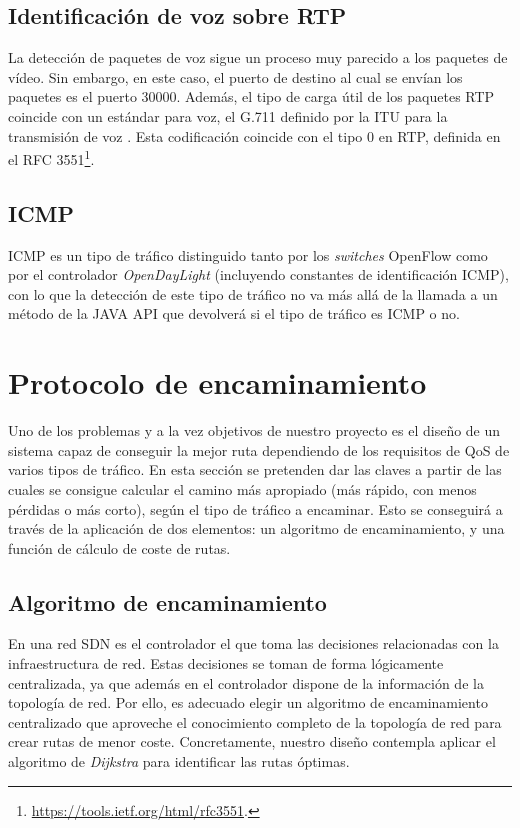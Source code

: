 \documentclass[a4paper,11pt]{book}
\begin{document}
%
\subsection{Identificación de voz sobre \ac{RTP}}
La detección de paquetes de voz sigue un proceso muy parecido a los paquetes de vídeo. Sin embargo, en este caso, el puerto de destino al cual se envían los paquetes es el puerto 30000. Además, el tipo de carga útil de los paquetes \ac{RTP} coincide con un estándar para voz, el G.711 definido por la \ac{ITU} para la transmisión de voz \cite{ituG711}. Esta codificación coincide con el tipo 0 en \ac{RTP}, definida en el RFC 3551\footnote{\url{https://tools.ietf.org/html/rfc3551}.}.

%
\subsection{\ac{ICMP}}
\ac{ICMP} es un tipo de tráfico distinguido tanto por los \textit{switches} OpenFlow como por el controlador \emph{OpenDayLight} (incluyendo constantes de identificación \ac{ICMP}), con lo que la detección de este tipo de tráfico no va más allá de la llamada a un método de la JAVA \ac{API} que devolverá si el tipo de tráfico es \ac{ICMP} o no.


%
%
\section{Protocolo de encaminamiento}
\label{sec:algoritmo-encaminamiento}

Uno de los problemas y a la vez objetivos de nuestro proyecto es el diseño de un sistema capaz de conseguir la mejor ruta dependiendo de los requisitos de \ac{QoS} de varios tipos de tráfico. En esta sección se pretenden dar las claves a partir de las cuales se consigue calcular el camino más apropiado (más rápido, con menos pérdidas o más corto), según el tipo de tráfico a encaminar. Esto se conseguirá a través de la aplicación de dos elementos: un algoritmo de encaminamiento, y una función de cálculo de coste de rutas.

\subsection{Algoritmo de encaminamiento}

En una red SDN es el controlador el que toma las decisiones relacionadas con la infraestructura de red. Estas decisiones se toman de forma lógicamente centralizada, ya que además en el controlador dispone de la información de la topología de red.
Por ello, es adecuado elegir un algoritmo de encaminamiento centralizado que aproveche el conocimiento completo de la topología de red para crear rutas de menor coste. Concretamente, nuestro diseño contempla aplicar el algoritmo de \textit{Dijkstra} para identificar las rutas óptimas.
\end{document}
